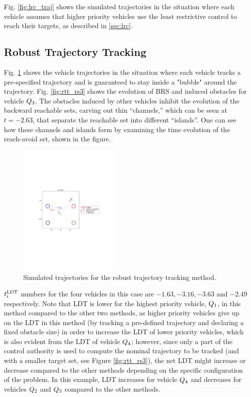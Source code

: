 Fig. \ref{fig:lrc_traj} shows the simulated trajectories in the situation where each vehicle assumes that higher priority vehicles use the least restrictive control to reach their targets, as described in \ref{sec:lrc}.

\subsection{Robust Trajectory Tracking}
Fig. \ref{fig:rtt_traj} shows the vehicle trajectories in the situation where each vehicle tracks a pre-specified trajectory and is guaranteed to stay inside a "bubble" around the trajectory. Fig. \ref{fig:rtt_rs3} shows the evolution of BRS and induced obstacles for vehicle $Q_3$. The obstacles induced by other vehicles inhibit the evolution of the backward reachable sets, carving out thin “channels,” which can be seen at $t = -2.63$, that separate the reachable set into different “islands”. One can see how these channels and islands form by examining the time evolution of the reach-avoid set, shown in the figure.

\begin{figure}
  \centering
  \includegraphics[width=0.45\textwidth]{"fig/rtt_traj"}
  \caption{Simulated trajectories for the robust trajectory tracking method.}
  \label{fig:rtt_traj}
\end{figure}

$t^\text{LDT}_i$ numbers for the four vehicles in this case are $-1.63, -3.16, -3.63$ and $-2.49$ respectively. Note that LDT is lower for the highest priority vehicle, $Q_1$, in this method compared to the other two methods, as higher priority vehicles give up on the LDT in this method (by tracking a pre-defined trajectory and declaring a fixed obstacle size) in order to increase the LDT of lower priority vehicles, which is also evident from the LDT of vehicle $Q_4$; however, since only a part of the control authority is used to compute the nominal trajectory to be tracked (and with a smaller target set, see Figure \ref{fig:rtt_rs3}), the net LDT might increase or decrease compared to the other methods depending on the specific configuration of the problem. In this example, LDT increases for vehicle $Q_4$ and decreases for vehicles $Q_2$ and $Q_3$ compared to the other methods.     

